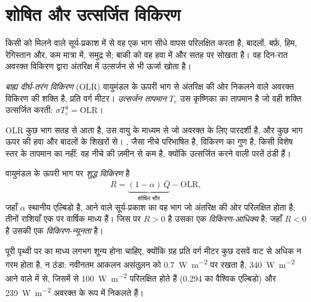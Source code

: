 \section{शोषित और उत्सर्जित विकिरण}\label{sec:b1:radiation-heat-transport:toa}

किसी  को मिलने वाले सूर्य-प्रकाश में से वह एक भाग सीधे वापस परिलक्षित करता है, बादलों, बर्फ़, हिम, रेगिस्तान और, कम मात्रा में, समुद्र से; बाकी को वह हवा में और सतह पर सोखता है। वह दिन-रात अवरक्त विकिरण द्वारा अंतरिक्ष में उत्सर्जन से भी ऊर्जा खोता है।

\begin{definition}[बाह्य दीर्घ-तरंग विकिरण]\label{def:b1:radiation-heat-transport:olr}
\emph{बाह्य दीर्घ-तरंग विकिरण} (OLR) वायुमंडल के ऊपरी भाग से अंतरिक्ष की ओर निकलने वाले अवरक्त विकिरण की शक्ति है, प्रति वर्ग मीटर। \emph{उत्सर्जन तापमान} $T_e$ उस कृष्णिका का तापमान है जो वही शक्ति उत्सर्जित करती: $\sigma T_e^4 = \text{OLR}$।
\end{definition}

OLR कुछ भाग सतह से आता है, उस वायु के माध्यम से जो अवरक्त के लिए पारदर्शी है, और कुछ भाग ऊपर की हवा और बादलों के शिखरों से। , जैसा नीचे परिभाषित है, विकिरण का गुण है, किसी विशेष स्तर के तापमान का नहीं: वह नीचे की ज़मीन से कम है, क्योंकि उत्सर्जित करने वाली परतें ठंडी हैं।

\begin{definition}[शुद्ध विकिरण; विकिरण-आधिक्य और न्यूनता]\label{def:b1:radiation-heat-transport:net-radiation}
वायुमंडल के ऊपरी भाग पर \emph{शुद्ध विकिरण} है
\[
  R = \underbrace{(1 - \alpha)\,\bar Q}_{\text{शोषित सौर}} - \text{OLR},
\]
जहाँ $\alpha$ स्थानीय एल्बिडो है, आने वाले सूर्य-प्रकाश का वह भाग जो अंतरिक्ष की ओर परिलक्षित होता है; तीनों राशियाँ एक  पर वार्षिक माध्य हैं। जिस  पर $R > 0$ है उसका एक \emph{विकिरण-आधिक्य} है; जहाँ $R < 0$ है उसकी एक \emph{विकिरण-न्यूनता} है।
\end{definition}

पूरी पृथ्वी पर  का माध्य लगभग शून्य होना चाहिए, क्योंकि ग्रह प्रति वर्ग मीटर कुछ दसवें वाट से अधिक न गरम होता है, न ठंडा: नवीनतम आकलन असंतुलन को \qty{0.7}{W.m^{-2}} पर रखता है, \qty{340}{W.m^{-2}} आने वाले में से, जिसमें से \qty{100}{W.m^{-2}} परिलक्षित होते हैं (\num{0.294} का वैश्विक एल्बिडो) और \qty{239}{W.m^{-2}} अवरक्त के रूप में निकलते हैं।

